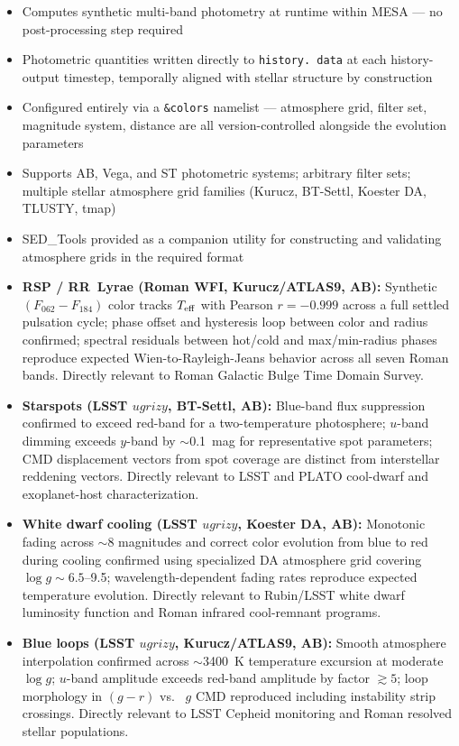 \documentclass[linenumbers,apj,twocolumn, floatfix]{aastex701}
\begin{document}
\begin{itemize}
	\item Computes synthetic multi-band photometry at runtime within MESA — no post-processing step required
	\item Photometric quantities written directly to \texttt{history.
		      data} at each history-output timestep, temporally aligned with stellar structure by construction \item Configured entirely via a \texttt{\&colors} namelist — atmosphere grid, filter set, magnitude system, distance are all version-controlled alongside the evolution parameters \item Supports AB, Vega, and ST photometric systems; arbitrary filter sets; multiple stellar atmosphere grid families (Kurucz, BT-Settl, Koester DA, TLUSTY, tmap) \item SED\_Tools provided as a companion utility for constructing and validating atmosphere grids in the required format \end{itemize} 

\begin{itemize} \item \textbf{RSP / RR~Lyrae (Roman WFI, Kurucz/ATLAS9, AB):} Synthetic $(F_{062}-F_{184})$ color tracks $T_{\rm eff}$ with Pearson $r = -0.999$ across a full settled pulsation cycle; phase offset and hysteresis loop between color and radius confirmed; spectral residuals between hot/cold and max/min-radius phases reproduce expected Wien-to-Rayleigh-Jeans behavior across all seven Roman bands.
	      Directly relevant to Roman Galactic Bulge Time Domain Survey.
	\item \textbf{Starspots (LSST $ugrizy$, BT-Settl, AB):}
	      Blue-band flux suppression confirmed to exceed red-band for a two-temperature photosphere; $u$-band dimming exceeds $y$-band by $\sim$0.1~mag for representative spot parameters; CMD displacement vectors from spot coverage are distinct from interstellar reddening vectors.
	      Directly relevant to LSST and PLATO cool-dwarf and exoplanet-host characterization.
	\item \textbf{White dwarf cooling (LSST $ugrizy$, Koester DA, AB):}
	      Monotonic fading across $\sim$8 magnitudes and correct color evolution from blue to red during cooling confirmed using specialized DA atmosphere grid covering $\log g \sim 6.5$--9.5; wavelength-dependent fading rates reproduce expected temperature evolution.
	      Directly relevant to Rubin/LSST white dwarf luminosity function and Roman infrared cool-remnant programs.
	\item \textbf{Blue loops (LSST $ugrizy$, Kurucz/ATLAS9, AB):}
	      Smooth atmosphere interpolation confirmed across $\sim$3400~K temperature excursion at moderate $\log g$; $u$-band amplitude exceeds red-band amplitude by factor $\gtrsim 5$; loop morphology in $(g-r)$ vs.
	      \ $g$ CMD reproduced including instability strip crossings.
	      Directly relevant to LSST Cepheid monitoring and Roman resolved stellar populations.
\end{itemize}
\end{document}
